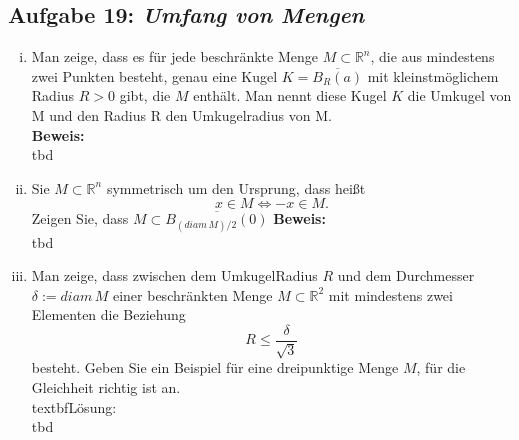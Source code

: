 \documentclass[11pt,a4paper,ngerman]{article}
\begin{document}
\subsection*{Aufgabe 19: \mdseries\itshape Umfang von Mengen}
	\begin{enumerate}[(i)]
		\item Man zeige, dass es für jede beschränkte Menge $M \subset \mathbb{R}^n$, die aus mindestens zwei Punkten besteht,
		genau eine Kugel $K = \overline{B_R(a)}$ mit kleinstmöglichem Radius $R > 0$ gibt, die $M$ enthält. Man nennt diese Kugel 
		$K$ die Umkugel von M und den Radius R den Umkugelradius von M.\\
		\textbf{Beweis:}\\
			tbd

		\item Sie $M \subset \mathbb{R}^n$ symmetrisch um den Ursprung, dass heißt
			$$
				x \in M \Longleftrightarrow -x \in M.
			$$
			Zeigen Sie, dass $M \subset \overline{B_{(diam \, M )/ 2}(0)}$
		\textbf{Beweis:}\\
			tbd

		\item Man zeige, dass zwischen dem UmkugelRadius $R$ und dem Durchmesser $\delta := diam \, M$ einer beschränkten Menge
		 $M \subset \mathbb{R}^2$ mit mindestens zwei Elementen die Beziehung
			$$
				R \leq \frac{\delta}{\sqrt{3}}
			$$
		besteht. Geben Sie ein Beispiel für eine dreipunktige Menge $M$, für die Gleichheit richtig ist an.\\
		textbf{Lösung:}\\
			tbd
	\end{enumerate}

\label{LastPage}
\end{document}
